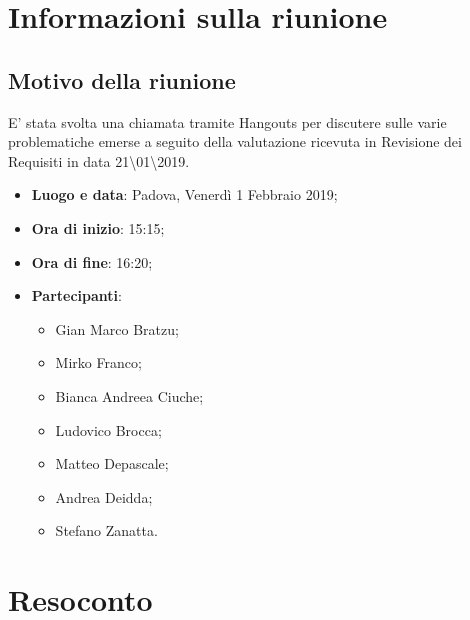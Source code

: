 \documentclass[a4paper,12pt]{article}
\begin{document}
	\tableofcontents
	\cleardoublepage
	\section{Informazioni sulla riunione}
	\subsection{Motivo della riunione} E' stata svolta una chiamata tramite Hangouts per discutere sulle varie problematiche emerse a seguito della valutazione ricevuta in Revisione dei Requisiti in data 21\textbackslash01\textbackslash2019.
	\begin{itemize}
		\item \textbf{Luogo e data}: Padova, Venerdì 1 Febbraio 2019;
		\item \textbf{Ora di inizio}: 15:15;
		\item \textbf{Ora di fine}: 16:20;
		\item \textbf{Partecipanti}:  
		\begin{itemize}
			\item Gian Marco Bratzu;
			\item Mirko Franco;
			\item Bianca Andreea Ciuche;
			\item Ludovico Brocca;
			\item Matteo Depascale;
			\item Andrea Deidda;
			\item Stefano Zanatta.
		\end{itemize}
	\end{itemize}
	
	
	\section{Resoconto}
\end{document}
